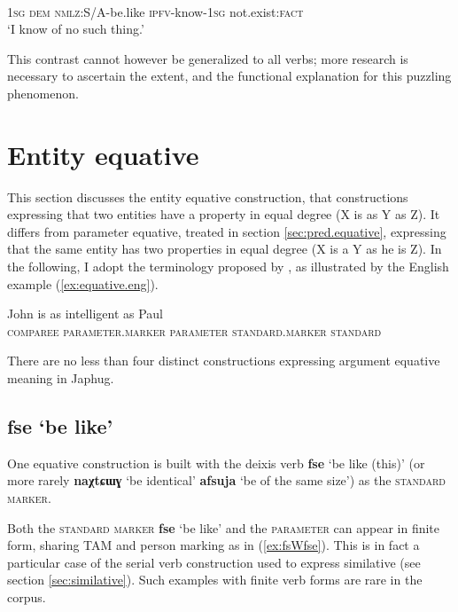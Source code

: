 \documentclass[oneside,a4paper,11pt]{article}
\newcommand{\ipa}[1]{{\phon\textbf{#1}}} %
\newcommand{\forme}[2]{\ipa{#1} `#2'}
\begin{document}
\begin{exe}
\ex \label{ex:pjWsWza}
\gll [\ipa{aʑo} 	\ipa{nɯ} 	\ipa{kɯ-fse} 	\ipa{pjɯ-sɯz-a}]	\ipa{me} \\
\textsc{1sg} \textsc{dem} \textsc{nmlz}:S/A-be.like \textsc{ipfv}-know-\textsc{1sg} not.exist:\textsc{fact} \\
\glt `I know of no such thing.'
\end{exe}

This contrast cannot however be generalized to all verbs; more research is necessary to ascertain the extent, and the functional explanation for this puzzling phenomenon.

\section{Entity equative} \label{sec:arg.equative}
This section discusses the entity equative construction, that constructions expressing that two entities have a property in equal degree (X is as Y as Z). It differs from parameter equative, treated in section \ref{sec:pred.equative}, expressing that the same entity has two properties in equal degree (X is a Y as he is Z). In the following, I adopt the terminology proposed by \citet{haspelmath08equative}, as illustrated by the English example (\ref{ex:equative.eng}). 

\begin{exe}
\ex \label{ex:equative.eng}
\gll  John is as intelligent as Paul \\
\textsc{comparee} { } \textsc{parameter.marker} \textsc{parameter} \textsc{standard.marker} \textsc{standard}  \\
\end{exe}

There are no less than four distinct constructions expressing argument equative meaning in Japhug. 

\subsection{\forme{fse}{be like}} \label{sec:fse}
One equative construction is built with the deixis verb \forme{fse}{be like (this)} (or more rarely \forme{naχtɕɯɣ}{be identical} \forme{afsuja}{be of the same size}) as the \textsc{standard marker}.

Both  the \textsc{standard marker} \forme{fse}{be like} and the \textsc{parameter} can appear in finite form, sharing TAM and person marking as in (\ref{ex:fsWfse}). This is in fact a particular case of the serial verb construction used to express similative (see section \ref{sec:similative}). Such examples with finite verb forms are rare in the corpus.
\end{document}

